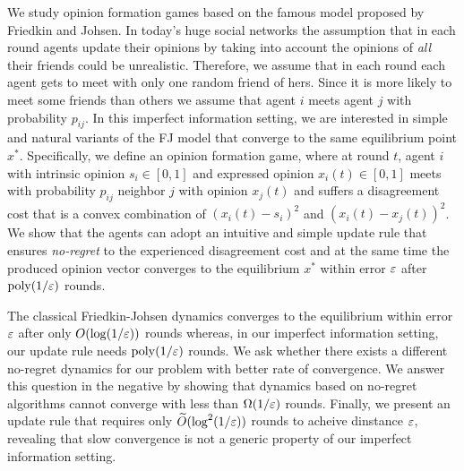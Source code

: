 We study opinion formation games based on the famous model proposed by Friedkin
and Johsen.  In today's huge social networks the assumption that in each round
agents update their opinions by taking into account the opinions of
\emph{all} their friends could be unrealistic. Therefore, we assume that
in each round each agent gets to meet with only one random friend of
hers. Since it is more likely to meet some friends than others we assume
that agent $i$ meets agent $j$ with probability $p_{ij}$.
In this imperfect information setting, we are interested in simple and
natural variants of the FJ model that converge to the same equilibrium point $x^*$.
Specifically, we define an opinion formation game, where at round $t$,
agent $i$ with intrinsic opinion $s_i\in[0,1]$ and expressed opinion $x_i(t)
\in[0,1]$ meets with probability $p_{ij}$ neighbor $j$ with opinion $x_j(t)$
and suffers a disagreement cost that is a convex combination of
$(x_i(t) - s_i)^2$ and $(x_i(t) - x_j(t))^2$.
We show that the agents can adopt an intuitive and simple update
rule that ensures \emph{no-regret} to the experienced disagreement cost
and at the same time the produced opinion vector converges
to the equilibrium $x^*$ within error $\varepsilon$ after
$\mathrm{poly}(1/\varepsilon)$ rounds.

The classical Friedkin-Johsen dynamics converges to the equilibrium within
error $\varepsilon$ after only $O(\log(1/\varepsilon))$ rounds whereas, in our imperfect
information setting, our update rule needs $\mathrm{poly}(1/\varepsilon)$ rounds.
We ask whether there exists a different no-regret dynamics for our problem
with better rate of convergence.  We answer this question in the negative
by showing that dynamics based on no-regret algorithms cannot converge with
less than $\Omega(1/\varepsilon)$ rounds.
Finally, we present an update rule that requires only $\widetilde{O}(\log^2(1/\varepsilon))$
rounds to acheive dinstance $\varepsilon$, revealing that slow convergence is not
a generic property of our imperfect information setting.
